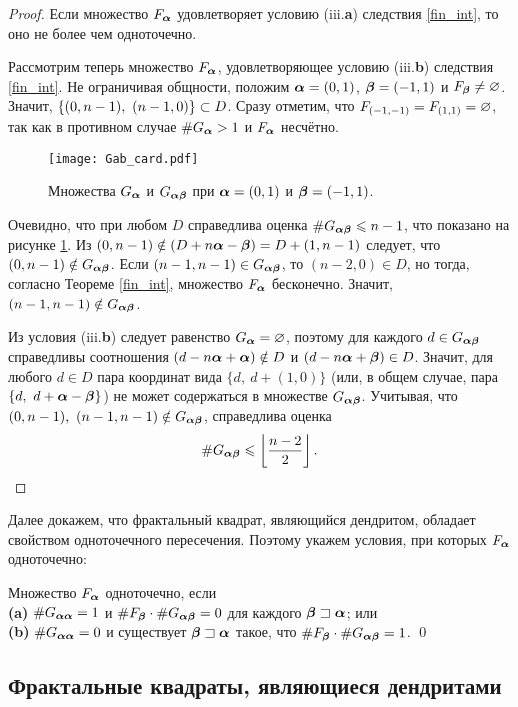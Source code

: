 \begin{proof}
Если множество $F_{\bm{\alpha}}$ удовлетворяет условию (iii.{\bf a}) следствия \ref{fin_int}, то оно не более чем одноточечно.

Рассмотрим теперь множество $F_{\bm{\alpha}}$, удовлетворяющее условию (iii.{\bf b}) следствия \ref{fin_int}.
Не ограничивая общности, положим ${\bm{\alpha}}=(0,1)$, ${\bm{\beta}}=(-1,1)$ и $F_{\bm{\beta}}\neq\varnothing$.
Значит, $\{(0,n-1),\ (n-1,0)\}\subset D$.
Сразу отметим, что $F_{(-1,-1)}=F_{(1,1)}=\varnothing$, так как в противном случае $\#G_{\bm{\alpha}}>1$ и $F_{\bm{\alpha}}$ несчётно.

\begin{figure}[h!]
\centering
\texttt{[image: Gab\_card.pdf]}
 \caption{Множества $G_{{\bm{\alpha}}}$ и $G_{{\bm{\alpha}}{\bm{\beta}}}$ при ${\bm{\alpha}}=(0,1)$ и ${\bm{\beta}}=(-1,1)$.}
 \label{fig:Gab}
\end{figure} 

Очевидно, что при любом $D$ справедлива оценка $\#G_{{\bm{\alpha}}{\bm{\beta}}}\leqslant n-1$, что показано на рисунке \ref{fig:Gab}.
Из $(0,n-1)\notin (D+n{\bm{\alpha}}-{\bm{\beta}})=D+(1,n-1)$ следует, что $(0,n-1)\notin G_{{\bm{\alpha}}{\bm{\beta}}}$.
Если $(n-1,n-1)\in G_{{\bm{\alpha}}{\bm{\beta}}}$, то $(n-2,0)\in D$, но тогда, согласно Теореме \ref{fin_int}, множество $F_{\bm{\alpha}}$ бесконечно.
Значит, $(n-1,n-1)\notin G_{{\bm{\alpha}}{\bm{\beta}}}$.

Из условия (iii.{\bf b}) следует равенство $G_{{\bm{\alpha}}}=\varnothing$, поэтому для каждого $d\in G_{{\bm{\alpha}}{\bm{\beta}}}$ справедливы соотношения $(d-n{\bm{\alpha}}+{\bm{\alpha}})\notin D$ и $(d-n{\bm{\alpha}}+{\bm{\beta}})\in D$.
Значит, для любого $d\in D$ пара координат вида $\{d,\ d+(1,0)\}$ (или, в общем случае, пара $\{d,\ d+\bma-\bmb\}$) не может содержаться в множестве $G_{{\bm{\alpha}}{\bm{\beta}}}$.
Учитывая, что $(0,n-1),\ (n-1,n-1)\notin G_{{\bm{\alpha}}{\bm{\beta}}}$, справедлива оценка 
$$\#G_{{\bm{\alpha}}{\bm{\beta}}}\leqslant\left\lfloor\dfrac{n-2}{2}\right\rfloor.$$
\end{proof}

Далее докажем, что фрактальный квадрат, являющийся дендритом, обладает свойством одноточечного пересечения.
Поэтому укажем условия, при которых $F_{\bm{\alpha}}$ одноточечно:

\begin{corollary}\label{onepoint} 
Множество $F_{\bm{\alpha}}$ одноточечно, если \\
\textbf{(a)} $\#G_{{\bm{\alpha}}{\bm{\alpha}}}=1$ и $\#F_{\bm{\beta}}\cdot\#G_{{\bm{\alpha}}{\bm{\beta}}}=0$ для каждого ${\bm{\beta}}\sqsupset{\bm{\alpha}}$; или\\
\textbf{(b)} $\#G_{{\bm{\alpha}}{\bm{\alpha}}}=0$ и существует ${\bm{\beta}}\sqsupset{\bm{\alpha}}$ такое, что $\#F_{\bm{\beta}}\cdot\#G_{{\bm{\alpha}}{\bm{\beta}}}=1$.
\hfill\qed
\end{corollary}


\subsection{Фрактальные квадраты, являющиеся дендритами}

